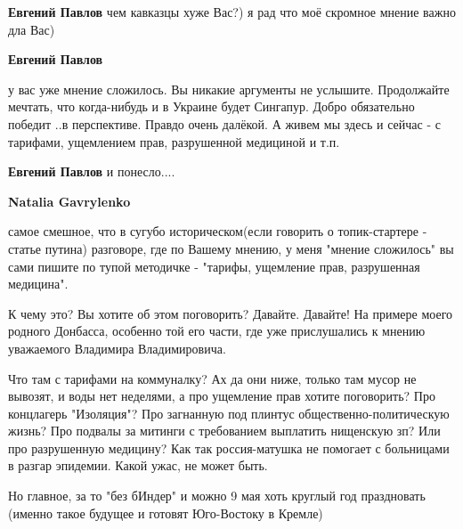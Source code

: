 \begin{itemize}
\begin{itemize}
\textbf{Евгений Павлов} чем кавказцы хуже Вас?) я рад что моё скромное мнение важно дла Вас)

 
\textbf{Евгений Павлов} 

у вас уже мнение сложилось. Вы никакие аргументы не услышите. Продолжайте
мечтать, что когда-нибудь и в Украине будет Сингапур. Добро обязательно победит
..в перспективе. Правдо очень далёкой. А живем мы здесь и сейчас - с тарифами,
ущемлением прав, разрушенной медициной и т.п.


 
\textbf{Евгений Павлов} и понесло....

 
\textbf{Natalia Gavrylenko} 

самое смешное, что в сугубо историческом(если говорить о топик-стартере -
статье путина) разговоре, где по Вашему мнению, у меня "мнение сложилось" вы
сами пишите по тупой методичке - "тарифы, ущемление прав, разрушенная
медицина". 

К чему это? Вы хотите об этом поговорить? Давайте. Давайте! На примере моего
родного Донбасса, особенно той его части, где уже прислушались к мнению
уважаемого Владимира Владимировича. 

Что там с тарифами на коммуналку? Ах да они ниже, только там мусор не вывозят,
и воды нет неделями, а про ущемление прав хотите поговорить? Про концлагерь
"Изоляция"? Про загнанную под плинтус общественно-политическую жизнь? Про
подвалы за митинги с требованием выплатить нищенскую зп? Или про разрушенную
медицину? Как так россия-матушка не помогает с больницами в разгар эпидемии.
Какой ужас, не может быть. 

Но главное, за то "без бИндер" и можно 9 мая хоть круглый год праздновать
(именно такое будущее и готовят Юго-Востоку в Кремле)



\end{itemize}
\end{itemize}

